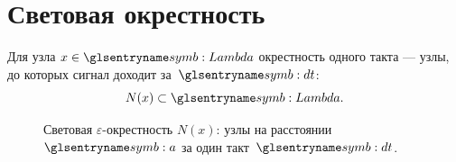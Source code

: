 \section{Световая окрестность}
\label{sec:epsilon}

\begin{definition}
\label{def:epsilon}
Для узла $x\in\carrierLattice$ окрестность одного такта --- узлы, до которых сигнал доходит за~$\htick$:
\[
  N(x)\subset\carrierLattice.
\]
\end{definition}

\begin{figure}[htbp]
  \centering
  
  \caption{Световая $\varepsilon$-окрестность $N(x)$: узлы на расстоянии~$\caStepSpace$ за один такт~$\htick$.}
  \label{fig:carrier-epsilon}
\end{figure}


